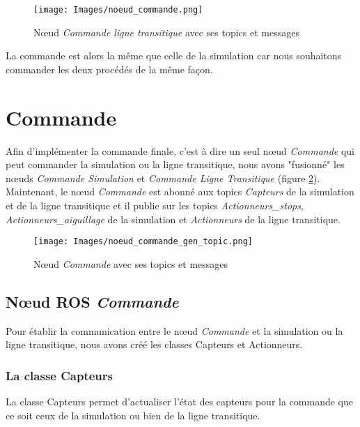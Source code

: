\documentclass[a4paper,french, titlepage]{book}
\begin{document}
\begin{figure}[H] 
\begin{center}
\texttt{[image: Images/noeud\_commande.png]} 
\end{center}
\caption{Nœud \emph{Commande ligne transitique} avec ses topics et messages}
\label{schema_noeud_commande_ligne_topic}
\end{figure}

La commande est alors la même que celle de la simulation car nous souhaitons commander les deux procédés de la même façon.

\section{Commande}

Afin d'implémenter la commande finale, c'est à dire un seul nœud \emph{Commande} qui peut commander la simulation ou la ligne transitique, nous avons "fusionné" les nœuds \emph{Commande Simulation} et \emph{Commande Ligne Transitique} (figure \ref{schema_noeud_commande_gen_topic}). Maintenant, le nœud \emph{Commande} est abonné aux topics \emph{Capteurs} de la simulation et de la ligne transitique et il publie sur les topics \emph{Actionneurs\_stops}, \emph{Actionneurs\_aiguillage} de la simulation et \emph{Actionneurs} de la ligne transitique.

\begin{figure}[H] 
\begin{center}
\texttt{[image: Images/noeud\_commande\_gen\_topic.png]} 
\end{center}
\caption{Nœud \emph{Commande} avec ses topics et messages}
\label{schema_noeud_commande_gen_topic}
\end{figure}

\subsection{Nœud ROS \textit{Commande}}

Pour établir la communication entre le nœud \emph{Commande} et la simulation ou la ligne transitique, nous avons créé les classes Capteurs et Actionneurs.

\subsubsection{La classe Capteurs}

La classe Capteurs permet d'actualiser l'état des capteurs pour la commande que ce soit ceux de la simulation ou bien de la ligne transitique.
\end{document}
